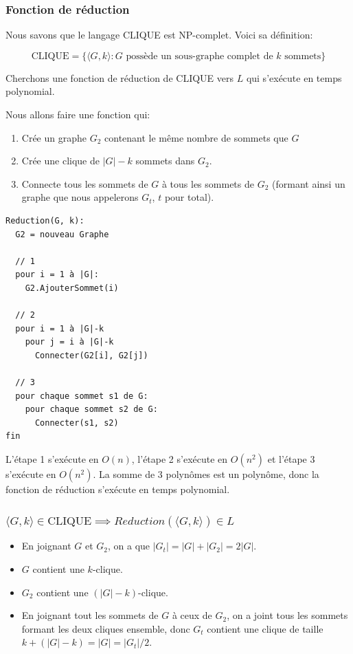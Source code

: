\documentclass[10pt]{article}
\begin{document}
\subsubsection{Fonction de réduction}

Nous savons que le langage CLIQUE est NP-complet.  Voici sa
définition:

\[
\text{CLIQUE} = \{ \langle G, k \rangle : G \text{ possède un sous-graphe complet de
  $k$ sommets} \}
\]


Cherchons une fonction de réduction de CLIQUE vers $L$ qui s'exécute
en temps polynomial.

Nous allons faire une fonction qui:

\begin{enumerate}
\item Crée un graphe $G_2$ contenant le même nombre de sommets que $G$
\item Crée une clique de $|G|-k$ sommets dans $G_2$.
\item Connecte tous les sommets de $G$ à tous les sommets de $G_2$
  (formant ainsi un graphe que nous appelerons $G_t$, $t$ pour total).
\end{enumerate}

\begin{verbatim}
Reduction(G, k):
  G2 = nouveau Graphe

  // 1
  pour i = 1 à |G|:
    G2.AjouterSommet(i)

  // 2
  pour i = 1 à |G|-k
    pour j = i à |G|-k
      Connecter(G2[i], G2[j])

  // 3
  pour chaque sommet s1 de G:
    pour chaque sommet s2 de G:
      Connecter(s1, s2)
fin
\end{verbatim}

L'étape 1 s'exécute en $O(n)$, l'étape 2 s'exécute en $O(n^2)$ et
l'étape 3 s'exécute en $O(n^2)$.  La somme de 3 polynômes est un
polynôme, donc la fonction de réduction s'exécute en temps polynomial.



\subsubsection{$\langle G,k \rangle \in \text{CLIQUE} \implies Reduction(\langle G,k \rangle) \in L$}

\begin{itemize}
\item En joignant $G$ et $G_2$, on a que $|G_t| = |G| + |G_2| = 2|G|$.
\item $G$ contient une $k$-clique.
\item $G_2$ contient une $(|G|-k)$-clique.
\item En joignant tout les sommets de $G$ à ceux de $G_2$, on a joint
  tous les sommets formant les deux cliques ensemble, donc $G_t$
  contient une clique de taille $k + (|G|-k) = |G| = |G_t|/2$.
\end{itemize}
\end{document}
